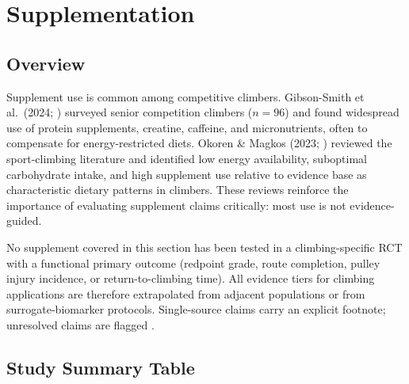\section{Supplementation}
\label{sec:supplements}

\subsection*{Overview}

Supplement use is common among competitive climbers. Gibson-Smith et al.\ (2024; \cite{GSSMR24}) surveyed senior competition climbers ($n{=}96$) and found widespread use of protein supplements, creatine, caffeine, and micronutrients, often to compensate for energy-restricted diets. Okoren \& Magkos (2023; \cite{OM23}) reviewed the sport-climbing literature and identified low energy availability, suboptimal carbohydrate intake, and high supplement use relative to evidence base as characteristic dietary patterns in climbers. These reviews reinforce the importance of evaluating supplement claims critically: most use is not evidence-guided.

No supplement covered in this section has been tested in a climbing-specific RCT with a functional primary outcome (redpoint grade, route completion, pulley injury incidence, or return-to-climbing time). All evidence tiers for climbing applications are therefore extrapolated from adjacent populations or from surrogate-biomarker protocols. Single-source claims carry an explicit footnote; unresolved claims are flagged \toverify.

\subsection{Study Summary Table}
\label{subsec:supptable}

